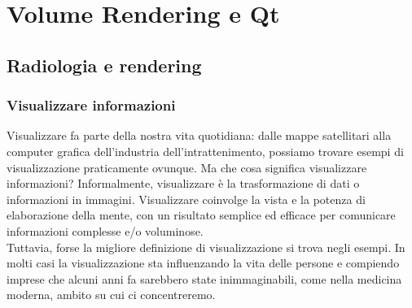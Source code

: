 
\chapter{Volume Rendering e Qt}
\label{cap:teoria-stage}

\section{Radiologia e rendering}
\subsection{Visualizzare informazioni}\label{sec:visualizzare-informazioni}
Visualizzare fa parte della nostra vita quotidiana: dalle mappe satellitari alla computer grafica dell'industria dell'intrattenimento, possiamo trovare esempi di visualizzazione praticamente ovunque. Ma che cosa significa visualizzare informazioni? Informalmente, visualizzare è la trasformazione di dati o informazioni in immagini. Visualizzare coinvolge la vista e la potenza di elaborazione della mente, con un risultato semplice ed efficace per comunicare informazioni complesse e/o voluminose.
\\
Tuttavia, forse la migliore definizione di visualizzazione si trova negli esempi. In molti casi la visualizzazione sta influenzando la vita delle persone e compiendo imprese che alcuni anni fa sarebbero state inimmaginabili, come nella medicina moderna, ambito su cui ci concentreremo.

